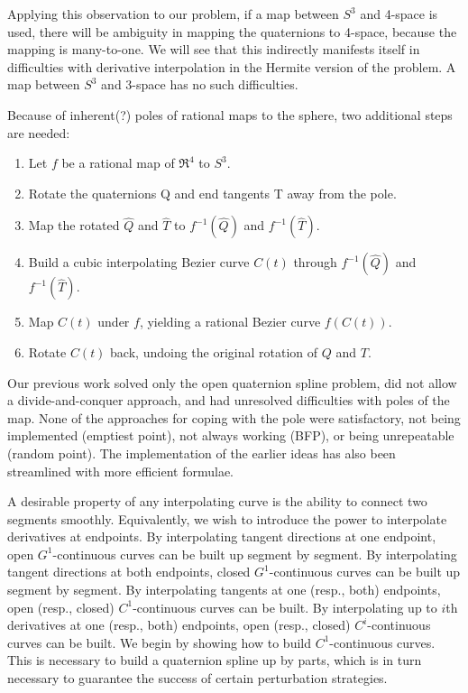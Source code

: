 \documentclass[12pt]{article}
\begin{document}
Applying this observation to our problem,
if a map between $S^3$ and 4-space is used, there will be ambiguity
in mapping the quaternions to 4-space, because the mapping is many-to-one.
We will see that this indirectly manifests itself in difficulties with 
derivative interpolation in the Hermite version of the problem.
A map between $S^3$ and 3-space has no such difficulties.

%
Because of inherent(?) poles of rational maps to the sphere, two additional steps
are needed:
\begin{enumerate}
\item Let $f$ be a rational map of $\Re^4$ to $S^3$.
\item Rotate the quaternions Q and end tangents T away from the pole.
\item Map the rotated $\hat{Q}$ and $\hat{T}$ to $f^{-1}(\hat{Q})$ and $f^{-1}(\hat{T})$.
\item Build a cubic interpolating Bezier curve $C(t)$ 
      through $f^{-1}(\hat{Q})$ and $f^{-1}(\hat{T})$.
\item Map $C(t)$ under $f$, yielding a rational Bezier curve $f(C(t))$.
\item Rotate $C(t)$ back, undoing the original rotation of $Q$ and $T$.
\end{enumerate}


Our previous work solved only the open quaternion spline problem,
did not allow a divide-and-conquer approach,
and had unresolved difficulties with poles of the map.
None of the approaches for coping with the pole were satisfactory,
not being implemented (emptiest point), not always working (BFP),
or being unrepeatable (random point).
The implementation of the earlier ideas has also been streamlined
with more efficient formulae.

\clearpage

A desirable property of any interpolating curve is the ability to connect
two segments smoothly.  
Equivalently, we wish to introduce the power to interpolate derivatives at endpoints.
By interpolating tangent directions at one endpoint, open $G^1$-continuous curves
can be built up segment by segment.
By interpolating tangent directions at both endpoints, closed $G^1$-continuous curves
can be built up segment by segment.
By interpolating tangents at one (resp., both) endpoints, 
open (resp., closed) $C^1$-continuous curves can be built.
By interpolating up to $i$th derivatives at one (resp., both) endpoints,
open (resp., closed) $C^i$-continuous curves can be built.
We begin by showing how to build $C^1$-continuous curves.
This is necessary to build a quaternion spline up by parts, which is in turn necessary
to guarantee the success of certain perturbation strategies.
\end{document}
